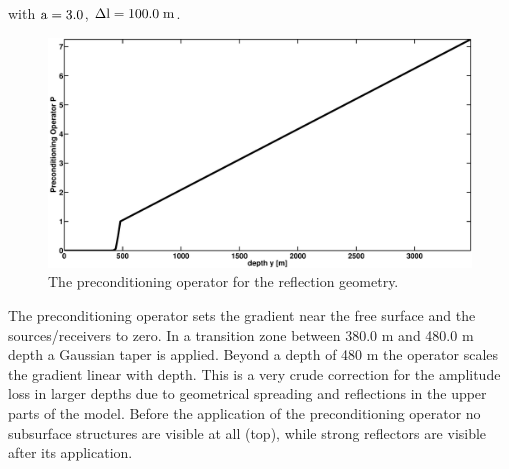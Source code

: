 with $\rm{a=3.0}$, $\rm{\Delta l=100.0\;m}$. \\
\begin{figure}[!ht]
\begin{center}
\includegraphics[width=12cm]{figures/marmousi/taper_grad_refl.pdf}
\caption{The preconditioning operator for the reflection geometry.}
\label{taper_grad_marm}
\end{center}
\end{figure}
The preconditioning operator sets the gradient near the free surface and the sources/receivers to zero. In a transition zone between 380.0 m and 480.0 m depth a Gaussian taper is applied. Beyond a depth of 480 m the operator scales the gradient linear with depth. This is a very crude correction for the amplitude loss in larger depths due to geometrical spreading and reflections in the upper parts of the model. Before the application of the preconditioning operator no subsurface structures are visible at all  (top), while strong reflectors are visible after its application.
\clearpage      
